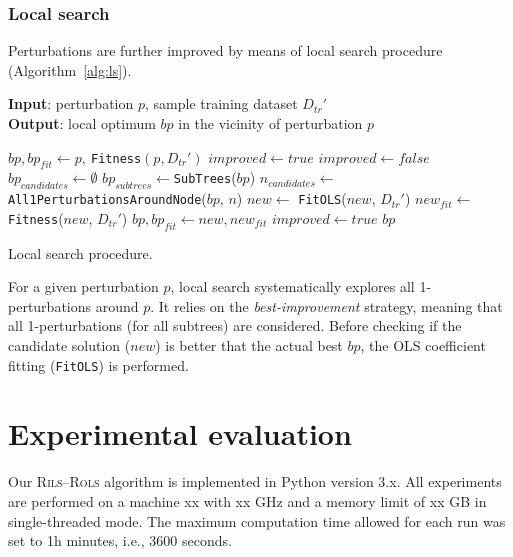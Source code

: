 \documentclass[a4paper,12pt]{elsarticle}
\begin{document}
\subsubsection{Local search}\label{sec:ls}

Perturbations are further improved by means of local search procedure (Algorithm~\ref{alg:ls}). 

\begin{algorithm}
	\hspace*{\algorithmicindent} \textbf{Input}: perturbation $p$, sample training dataset $D_{tr}'$ \\
	\hspace*{\algorithmicindent} \textbf{Output}: local optimum $bp$ in the vicinity of perturbation $p$
	\begin{algorithmic}[1] 
		\State $bp, bp_{fit} \gets p,\ $\texttt{Fitness}$(p,D_{tr}')$ 
		\State $improved \gets true$
			\State $improved \gets false$
			\State $bp_{candidates} \gets \emptyset$
			\State $bp_{subtrees} \gets $\texttt{SubTrees}($bp$)
				\State $n_{candidates} \gets $ \texttt{All1PerturbationsAroundNode}($bp$, $n$)
					\State $new \gets$ \texttt{FitOLS}($new$, $D_{tr}'$)
					\State $new_{fit} \gets$ \texttt{Fitness}($new$, $D_{tr}'$)
						\State $bp, bp_{fit} \gets new, new_{fit}$
						\State $improved \gets true$
					\EndIf
				\EndFor
			\EndFor
		\EndWhile
		\State \Return $bp$
		\EndProcedure
	\end{algorithmic}
	\caption{Local search procedure.}
	\label{alg:ls}
\end{algorithm}  

For a given perturbation $p$, local search systematically explores all 1-perturbations around $p$. It relies on the \emph{best-improvement} strategy, meaning that all 1-perturbations (for all subtrees) are considered. Before checking if the candidate solution ($new$) is better that the actual best $bp$, the OLS coefficient fitting (\texttt{FitOLS}) is performed. 
   
\section{Experimental evaluation}\label{sec:experiments}

Our \textsc{Rils}--\textsc{Rols} algorithm is implemented in Python version 3.x. All experiments are performed on a machine xx with xx GHz and a memory limit of xx GB in single-threaded mode. The maximum computation time allowed for each run was set to 1h minutes, i.e., 3600 seconds.
 
\end{document}
